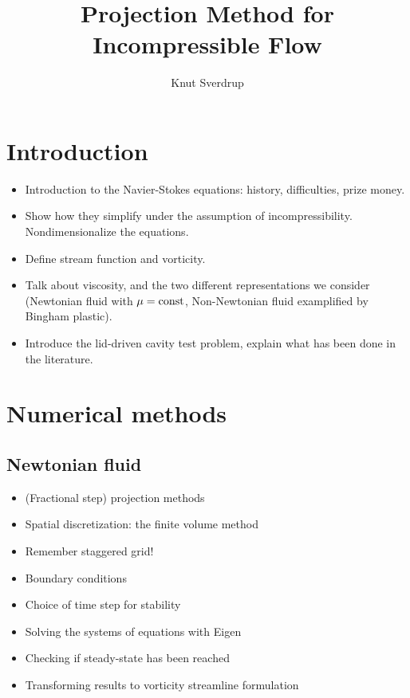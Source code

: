 \documentclass[final,3p,twocolumn]{elsarticle}
\begin{document}
\begin{frontmatter}

\title{Projection Method for Incompressible Flow}

\author{Knut Sverdrup}

\begin{abstract}
\end{abstract}

\end{frontmatter}

\section{Introduction}
\label{sec:introduction}

\begin{itemize}
    \item Introduction to the Navier-Stokes equations: history, difficulties,
        prize money. 
    \item Show how they simplify under the assumption of incompressibility.
        Nondimensionalize the equations. 
    \item Define stream function and vorticity.
    \item Talk about viscosity, and the two different representations we
        consider (Newtonian fluid with $\mu={\rm const}$, Non-Newtonian fluid
        examplified by Bingham plastic). 
    \item Introduce the lid-driven cavity test problem, explain what has been
        done in the literature. 
\end{itemize}

\section{Numerical methods}
\label{sec:numerical}

\subsection{Newtonian fluid}
\label{subsec:newtonian}

\begin{itemize}
    \item (Fractional step) projection methods 
    \item Spatial discretization: the finite volume method
    \item Remember staggered grid!
    \item Boundary conditions
    \item Choice of time step for stability
    \item Solving the systems of equations with Eigen
    \item Checking if steady-state has been reached
    \item Transforming results to vorticity streamline formulation
\end{itemize}
\end{document}

